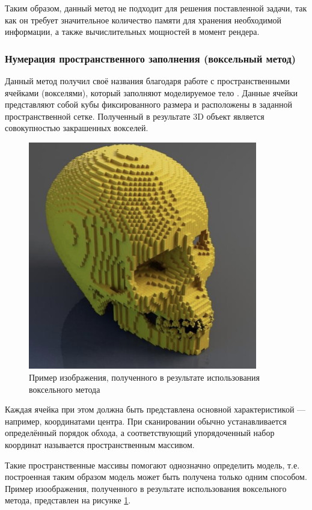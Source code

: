 Таким образом, данный метод не подходит для решения поставленной 
задачи, так как он требует значительное количество памяти для хранения 
необходимой информации, а также вычислительных мощностей в момент 
рендера.

\subsubsection{Нумерация пространственного заполнения (воксельный метод)} \label{sec:numeric}

Данный метод получил своё названия благодаря работе с 
пространственными ячейками (вокселями), который заполняют моделируемое 
тело \cite{numeric-octree}.
Данные ячейки представляют собой кубы фиксированного размера и 
расположены в заданной пространственной сетке.
Полученный в результате 3D 
объект является совокупностью закрашенных вокселей. 

\begin{figure}[h]
	\centering
	\captionsetup{justification=centering}
	\includegraphics[width=100mm]{img/numeric.png}
	\caption{Пример изображения, полученного в результате 
		использования воксельного метода}
	\label{fig:numeric}
\end{figure}

Каждая ячейка при этом должна быть представлена основной 
характеристикой --- например, координатами центра.
При сканировании 
обычно устанавливается определённый порядок обхода, а соответствующий 
упорядоченный набор координат называется пространственным массивом.

Такие пространственные массивы помогают однозначно определить модель, т.е. построенная таким образом модель может быть получена только одним способом.
Пример изоображения, полученного в результате использования воксельного метода, представлен на рисунке \ref{fig:numeric}.

